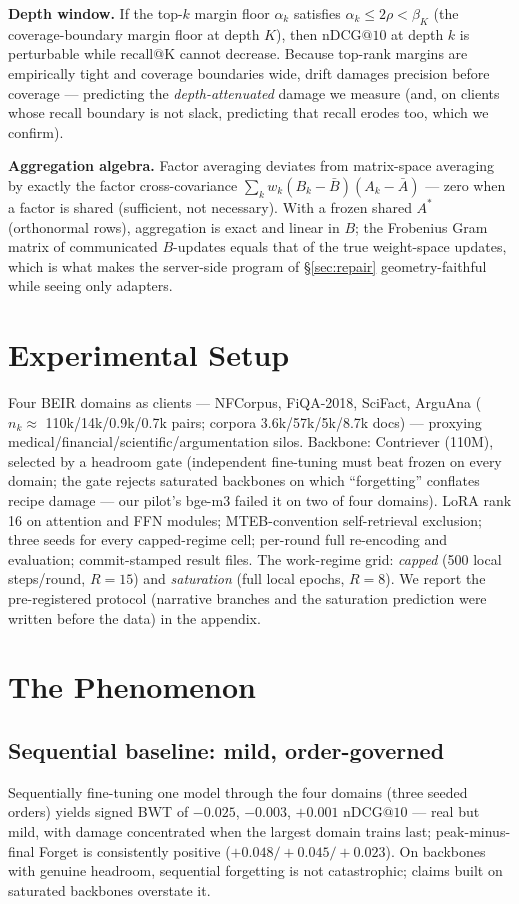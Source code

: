 \documentclass[sigconf,anonymous,review]{acmart}
\makeatletter
\newcommand{\ndcg}{\mathrm{nDCG@10}}
\newcommand{\rc}[1]{\mathrm{recall@#1}}
\makeatother
\begin{document}
\textbf{Depth window.} If the top-$k$ margin floor $\alpha_k$ satisfies $\alpha_k \le 2\rho < \beta_K$ (the coverage-boundary margin floor at depth $K$), then $\ndcg$ at depth $k$ is perturbable while $\rc{K}$ cannot decrease. Because top-rank margins are empirically tight and coverage boundaries wide, drift damages precision before coverage --- predicting the \emph{depth-attenuated} damage we measure (and, on clients whose recall boundary is not slack, predicting that recall erodes too, which we confirm).

\textbf{Aggregation algebra.} Factor averaging deviates from matrix-space averaging by exactly the factor cross-covariance $\sum_k w_k (B_k-\bar B)(A_k-\bar A)$ --- zero when a factor is shared (sufficient, not necessary). With a frozen shared $A^\ast$ (orthonormal rows), aggregation is exact and linear in $B$; the Frobenius Gram matrix of communicated $B$-updates equals that of the true weight-space updates, which is what makes the server-side program of \S\ref{sec:repair} geometry-faithful while seeing only adapters.

\section{Experimental Setup}\label{sec:setup}
Four BEIR domains as clients --- NFCorpus, FiQA-2018, SciFact, ArguAna ($n_k \approx$ 110k/14k/0.9k/0.7k pairs; corpora 3.6k/57k/5k/8.7k docs) --- proxying medical/financial/scientific/argumentation silos. Backbone: Contriever (110M), selected by a headroom gate (independent fine-tuning must beat frozen on every domain; the gate rejects saturated backbones on which ``forgetting'' conflates recipe damage --- our pilot's bge-m3 failed it on two of four domains). LoRA rank 16 on attention and FFN modules; MTEB-convention self-retrieval exclusion; three seeds for every capped-regime cell; per-round full re-encoding and evaluation; commit-stamped result files. The work-regime grid: \emph{capped} (500 local steps/round, $R{=}15$) and \emph{saturation} (full local epochs, $R{=}8$). We report the pre-registered protocol (narrative branches and the saturation prediction were written before the data) in the appendix.

\section{The Phenomenon}\label{sec:phenomenon}
\subsection{Sequential baseline: mild, order-governed}
Sequentially fine-tuning one model through the four domains (three seeded orders) yields signed BWT of $-0.025$, $-0.003$, $+0.001$ $\ndcg$ --- real but mild, with damage concentrated when the largest domain trains last; peak-minus-final Forget is consistently positive ($+0.048/+0.045/+0.023$). On backbones with genuine headroom, sequential forgetting is not catastrophic; claims built on saturated backbones overstate it.
\end{document}
